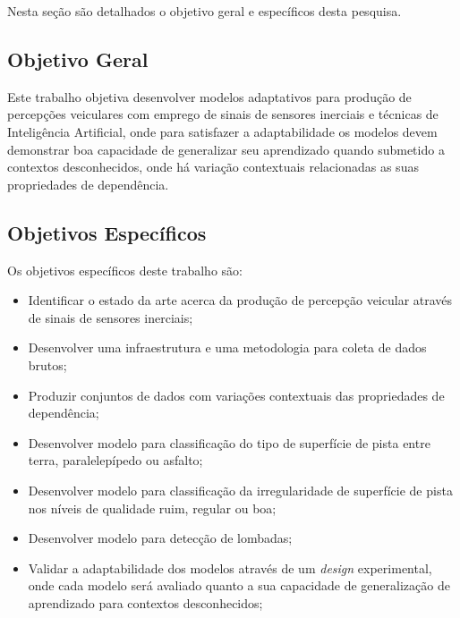 Nesta seção são detalhados o objetivo geral e específicos desta pesquisa.

\subsection{Objetivo Geral}

Este trabalho objetiva desenvolver modelos adaptativos para produção de percepções veiculares com emprego de sinais de sensores inerciais e técnicas de Inteligência Artificial, onde para satisfazer a adaptabilidade os modelos devem demonstrar boa capacidade de generalizar seu aprendizado quando submetido a contextos desconhecidos, onde há variação contextuais relacionadas as suas propriedades de dependência.

\subsection{Objetivos Específicos}

Os objetivos específicos deste trabalho são:

\begin{itemize}

\item Identificar o estado da arte acerca da produção de percepção veicular através de sinais de sensores inerciais;

\item Desenvolver uma infraestrutura e uma metodologia para coleta de dados brutos;

\item Produzir conjuntos de dados com variações contextuais das propriedades de dependência;

\item Desenvolver modelo para classificação do tipo de superfície de pista entre terra, paralelepípedo ou asfalto;

\item Desenvolver modelo para classificação da irregularidade de superfície de pista nos níveis de qualidade ruim, regular ou boa;

\item Desenvolver modelo para detecção de lombadas;

\item Validar a adaptabilidade dos modelos através de um \textit{design} experimental, onde cada modelo será avaliado quanto a sua capacidade de generalização de aprendizado para contextos desconhecidos;

\end{itemize}

